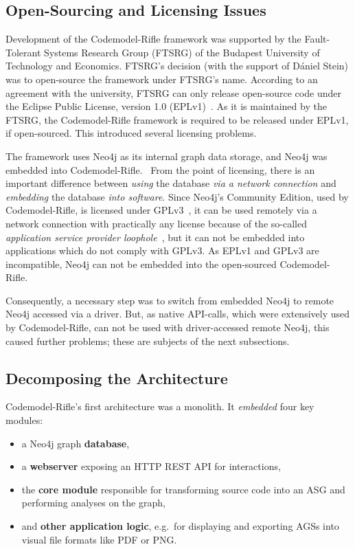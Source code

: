 \subsection{Open-Sourcing and Licensing Issues}

Development of the Codemodel-Rifle framework was supported by the Fault-Tolerant Systems Research Group (FTSRG) of the Budapest University of Technology and Economics. FTSRG's decision (with the support of Dániel Stein) was to open-source the framework under FTSRG's name. According to an agreement with the university, FTSRG can only release open-source code under the Eclipse Public License, version 1.0 (EPLv1)~\cite{eplv1}. As it is maintained by the FTSRG, the Codemodel-Rifle framework is required to be released under EPLv1, if open-sourced. This introduced several licensing problems.~\cite{codemodel-rifle-licensing}

The framework uses Neo4j as its internal graph data storage, and Neo4j was embedded into Codemodel-Rifle.~\cite{stein-daniel-msc} From the point of licensing, there is an important difference between \emph{using} the database \emph{via a network connection} and \emph{embedding} the database \emph{into software}. Since Neo4j's Community Edition, used by Codemodel-Rifle, is licensed under GPLv3~\cite{neo4j-licensing}, it can be used remotely via a network connection with practically any license because of the so-called \emph{application service provider loophole}~\cite{asp-loophole}, but it can not be embedded into applications which do not comply with GPLv3. As EPLv1 and GPLv3 are incompatible, Neo4j can not be embedded into the open-sourced Codemodel-Rifle.

Consequently, a necessary step was to switch from embedded Neo4j to remote Neo4j accessed via a driver. But, as native API-calls, which were extensively used by Codemodel-Rifle, can not be used with driver-accessed remote Neo4j, this caused further problems; these are subjects of the next subsections.


\subsection{Decomposing the Architecture}

Codemodel-Rifle's first architecture was a monolith. It \emph{embedded} four key modules:

\begin{itemize}
\item a Neo4j graph \textbf{database},
\item a \textbf{webserver} exposing an HTTP REST API for interactions,
\item the \textbf{core module} responsible for transforming source code into an ASG and performing analyses on the graph,
\item and \textbf{other application logic}, e.g.\ for displaying and exporting AGSs into visual file formats like PDF or PNG.
\end{itemize}

